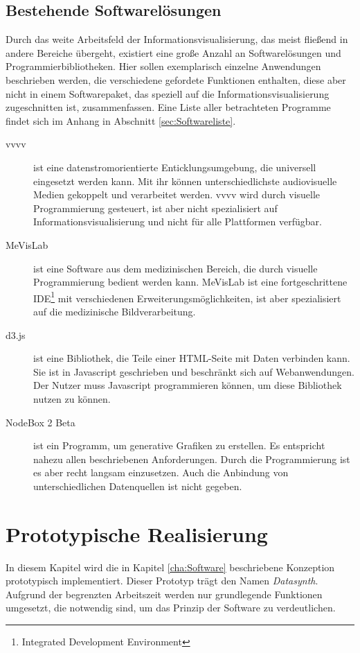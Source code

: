 \documentclass[a4paper, 
               12pt,
               DIV=calc,
               version=first,
               pdftex,
               headsepline,
               footsepline,
               bibtotocnumbered,
               liststotocnumbered]{scrreprt}
\begin{document}
\section{Bestehende Softwarelösungen}
\label{sec:bestehendeSoftware}
Durch das weite Arbeitsfeld der Informationsvisualisierung, das meist
fließend in andere Bereiche übergeht, existiert eine große Anzahl an
Softwarelösungen und Programmierbibliotheken. Hier sollen exemplarisch
einzelne Anwendungen beschrieben werden, die verschiedene gefordete
Funktionen enthalten, diese aber nicht in einem Softwarepaket, das
speziell auf die Informationsvisualisierung zugeschnitten ist, zusammenfassen.
Eine Liste aller betrachteten Programme findet sich im Anhang in Abschnitt
\ref{sec:Softwareliste}.
\begin{description}
\item[vvvv]
ist eine datenstromorientierte Enticklungsumgebung, die universell eingesetzt werden kann.
Mit ihr können unterschiedlichste audiovisuelle Medien gekoppelt und
verarbeitet werden. vvvv wird durch visuelle Programmierung gesteuert, ist aber
nicht spezialisiert auf Informationsvisualisierung und nicht für alle
Plattformen verfügbar.
\item[MeVisLab]
ist eine Software aus dem medizinischen Bereich, die durch visuelle
Programmierung bedient werden kann. MeVisLab ist eine fortgeschrittene
IDE\footnote{Integrated Development Environment} mit verschiedenen
Erweiterungsmöglichkeiten, ist aber spezialisiert auf die medizinische
Bildverarbeitung.
\item[d3.js]
ist eine Bibliothek, die Teile einer HTML-Seite mit Daten verbinden kann.
Sie ist in Javascript geschrieben und beschränkt sich auf
Webanwendungen. Der Nutzer muss Javascript programmieren können, um diese
Bibliothek nutzen zu können.
\item[NodeBox 2 Beta]
ist ein Programm, um generative Grafiken zu erstellen. Es entspricht nahezu
allen beschriebenen Anforderungen. Durch die Programmierung ist es aber recht
langsam einzusetzen. Auch die Anbindung von unterschiedlichen Datenquellen
ist nicht gegeben.
\end{description}

\chapter{Prototypische Realisierung}
\label{cha:Umsetzung}
In diesem Kapitel wird die in Kapitel \ref{cha:Software} beschriebene Konzeption prototypisch implementiert.
Dieser Prototyp trägt den Namen \textit{Datasynth}.
Aufgrund der begrenzten Arbeitszeit werden nur grundlegende Funktionen umgesetzt,
die notwendig sind, um das Prinzip der Software zu verdeutlichen.
\end{document}
